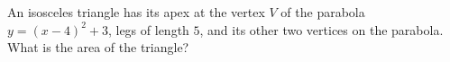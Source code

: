 An isosceles triangle has its apex at the vertex $V$ of the parabola $y=(x-4)^2+3$, legs of length $5$, and its other two vertices on the parabola. What is the area of the triangle?
